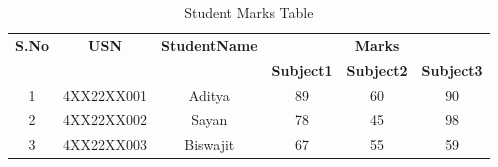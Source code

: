 \documentclass{article}
\begin{document}
\begin{table}[h!]
    \centering
    \caption{Student Marks Table}
    \begin{tabular}{|c|c|c|c|c|c|}
        \hline
        \textbf{S.No} & \textbf{USN} & \textbf{StudentName} & \multicolumn{3}{c|}{\textbf{Marks}} \\
        \cline{4-6}
        & & & \textbf{Subject1} & \textbf{Subject2} & \textbf{Subject3} \\
        \hline
        1 & 4XX22XX001 & Aditya & 89 & 60 & 90 \\
        \hline
        2 & 4XX22XX002 & Sayan & 78 & 45 & 98 \\
        \hline
        3 & 4XX22XX003 & Biswajit & 67 & 55 & 59 \\
        \hline
    \end{tabular}
    \label{tab:studentmarks}
\end{table}
\end{document}
